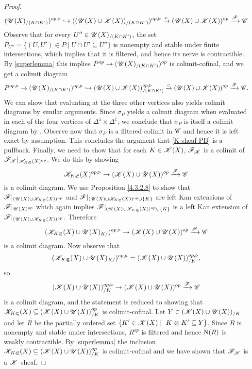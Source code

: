 \documentclass[../../thesis.tex]{subfiles}
\begin{document}
\begin{proof}
    \[
        (\mathscr{U}(X)_{/(K\cap K')})^{op,\triangleright} \hookrightarrow ((\mathscr{U}(X) \cup \mathscr{K}(X))_{/(K\cap K')})^{op,\triangleright} \xrightarrow{c} (\mathscr{U}(X) \cup \mathscr{K}(X))^{op} \xrightarrow{\mathscr{F}}\mathscr{C}
    \]
    Observe that for every $U'' \in \mathscr{U}(X)_{/(K\cap K')}$, the set
    $P_{U''} = \{(U,U') \in P \mid U\cap U' \subseteq U''\}$ is nonempty and stable under finite intersections, which implies that it is filtered, and hence its nerve is contractible.
    By \ref{superlemma} this implies $P^{op} \to (\mathscr{U}(X)_{/(K\cap K')})^{op}$ is colimit-cofinal, and we get a colimit diagram
    \[
        P^{op,\triangleright} \to(\mathscr{U}(X)_{/(K\cap K')})^{op,\triangleright} \hookrightarrow (\mathscr{U}(X) \cup \mathscr{K}(X))_{/(K\cap K')}^{op,\triangleright} \xrightarrow{c} (\mathscr{U}(X) \cup \mathscr{K}(X))^{op} \xrightarrow{\mathscr{F}}\mathscr{C}.
    \]
    We can show that evaluating at the three other vertices also yields colimit diagrams by similar arguments.
    Since $\sigma_P$ yields a colimit diagram when evaluated in each of the four vertices of $\Delta^1 \times \Delta^1$, we conclude that $\sigma_P$ is itself a colimit diagram by \cite[Proposition 5.1.2.2]{HTT}.
    Observe now that $\sigma_P$ is a filtered colimit in $\mathscr{C}$ and hence it is left exact by assumption.
    This concludes the argument that \ref{K-sheaf-PB} is a pullback.
    Finally, we need to show that for each $K \in \mathscr{K}(X)$, $\mathscr{F}_{\mathscr{K}}$ is a colimit of $\mathscr{F}_{\mathscr{K}}|_{\mathscr{K}_{K\Subset}(X)^{op}}$.
    We do this by showing
    \[
        \mathscr{K}_{K\Subset}(X)^{op,\triangleright} \to (\mathscr{K}(X) \cup \mathscr{U}(X))^{op} \xrightarrow{\mathscr{F}} \mathscr{C}
    \]
    is a colimit diagram.
    We use Proposition \ref{4.3.2.8} to show that
    $\mathscr{F}|_{(\mathscr{U}(X) \cup \mathscr{K}_{K\Subset}(X))^{op}}$ and ${\mathscr{F}|_{(\mathscr{U}(X) \cup \mathscr{K}_{K\Subset}(X))^{op} \cup \{K\}}}$ are left Kan extensions of $\mathscr{F}|_{\mathscr{U}(X)^{op}}$ which again implies $\mathscr{F}|_{(\mathscr{U}(X) \cup \mathscr{K}_{K\Subset}(X))^{op} \cup \{K\}}$ is a left Kan extension of $\mathscr{F}|_{(\mathscr{U}(X) \cup \mathscr{K}_{K\Subset}(X))^{op}}$.
    Therefore
    \[
        (\mathscr{K}_{K\Subset}(X) \cup \mathscr{U}(X)_{K/})^{op,\triangleright} \to (\mathscr{K}(X) \cup \mathscr{U}(X))^{op} \xrightarrow{\mathscr{F}} \mathscr{C}
    \]
    is a colimit diagram.
    Now observe that
    \[
        (\mathscr{K}_{K\Subset}(X) \cup \mathscr{U}(X)_{K/})^{op,\triangleright} = (\mathscr{K}(X) \cup \mathscr{U}(X))^{op,\triangleright}_{/K},
    \]
    so
    \[
        (\mathscr{K}(X) \cup \mathscr{U}(X))^{op,\triangleright}_{/K} \to (\mathscr{K}(X) \cup \mathscr{U}(X))^{op} \xrightarrow{\mathscr{F}} \mathscr{C}
    \]
    is a colimit diagram, and the statement is reduced to showing that $\mathscr{K}_{K\Subset}(X) \subseteq (\mathscr{K}(X) \cup \mathscr{U}(X))_{/K}^{op}$ is colimit-cofinal.
    Let $Y\in (\mathscr{K}(X) \cup \mathscr{U}(X))_{/K}$ and let $R$ be the partially ordered set $\{K' \in \K(X) \mid K \Subset K ' \subseteq Y\}$.
    Since $R$ is nonempty and stable under intersections, $R^{op}$ is filtered and hence $\mathrm{N}(R)$ is weakly contractible.
    By \ref{superlemma} the inclusion $\mathscr{K}_{K\Subset}(X) \subseteq (\mathscr{K}(X) \cup \mathscr{U}(X))_{/K}^{op}$ is colimit-cofinal and we have shown that $\mathscr{F}_{\mathscr{K}}$ is a $\mathscr{K}$-sheaf.
\end{proof}
\end{document}
